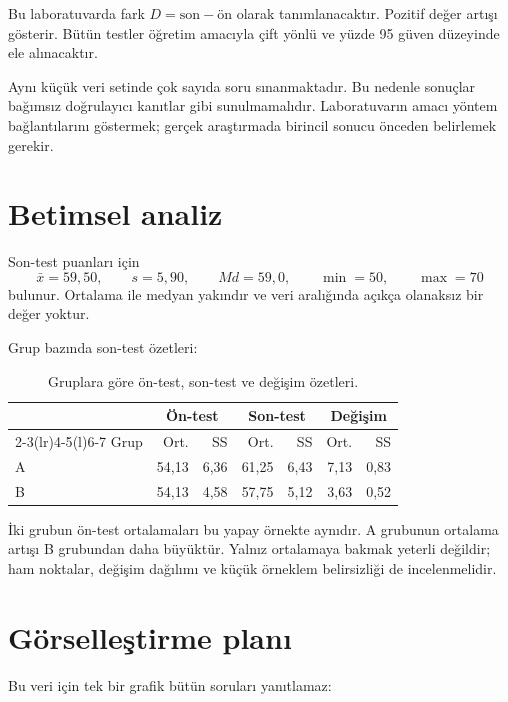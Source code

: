 Bu laboratuvarda fark $D=\text{son}-\text{ön}$ olarak tanımlanacaktır. Pozitif
değer artışı gösterir. Bütün testler öğretim amacıyla çift yönlü ve yüzde 95
güven düzeyinde ele alınacaktır.

\begin{researchbox}
Aynı küçük veri setinde çok sayıda soru sınanmaktadır. Bu nedenle sonuçlar
bağımsız doğrulayıcı kanıtlar gibi sunulmamalıdır. Laboratuvarın amacı yöntem
bağlantılarını göstermek; gerçek araştırmada birincil sonucu önceden
belirlemek gerekir.
\end{researchbox}

\section{Betimsel analiz}

Son-test puanları için
\[
\bar x=59{,}50,
\qquad s=5{,}90,
\qquad Md=59{,}0,
\qquad \min=50,
\qquad \max=70
\]
bulunur. Ortalama ile medyan yakındır ve veri aralığında açıkça olanaksız bir
değer yoktur.

Grup bazında son-test özetleri:

\begin{table}[htbp]
\centering
\caption{Gruplara göre ön-test, son-test ve değişim özetleri.}
\begin{tabular}{@{}lrrrrrr@{}}
\toprule
 & \multicolumn{2}{c}{Ön-test} & \multicolumn{2}{c}{Son-test} & \multicolumn{2}{c}{Değişim} \\
\cmidrule(lr){2-3}\cmidrule(lr){4-5}\cmidrule(l){6-7}
Grup & Ort. & SS & Ort. & SS & Ort. & SS \\
\midrule
A & 54,13 & 6,36 & 61,25 & 6,43 & 7,13 & 0,83 \\
B & 54,13 & 4,58 & 57,75 & 5,12 & 3,63 & 0,52 \\
\bottomrule
\end{tabular}
\end{table}

İki grubun ön-test ortalamaları bu yapay örnekte aynıdır. A grubunun ortalama
artışı B grubundan daha büyüktür. Yalnız ortalamaya bakmak yeterli değildir;
ham noktalar, değişim dağılımı ve küçük örneklem belirsizliği de incelenmelidir.

\section{Görselleştirme planı}

Bu veri için tek bir grafik bütün soruları yanıtlamaz:

